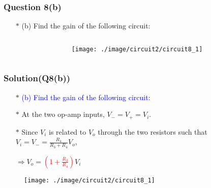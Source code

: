 \documentclass{beamer}
\newcommand{\blue}[1]{\textcolor{blue}{#1}}
\newcommand{\red}[1]{\textcolor{red}{#1}}
\begin{document}
\begin{frame}
\frametitle{Question 8(b)}
\begin{itemize} \itemsep1pt \parskip0pt 
  \item[$\ast$] (b) Find the gain of the following circuit:
\end{itemize}

\begin{columns}

\begin{column}{6cm}

\end{column}


\begin{column}{6cm}
\begin{figure}[H]
  \centering
  \texttt{[image: ./image/circuit2/circuit8\_1]}
\end{figure}
\end{column}

\end{columns}

\end{frame}


\begin{frame}
\frametitle{Solution(Q8(b))}
\begin{itemize} \itemsep1pt \parskip0pt 
  \item[$\ast$] \blue{(b) Find the gain of the following circuit:}
  \item[$\ast$] At the two op-amp inputs, $V_- = V_+ = V_i$.
  \item[$\ast$] Since $V_i$ is related to $V_o$ through the two resistors such that $V_i = V_- = \frac{R_4}{R_3 + R_4}V_o$,
  \item[] $\Rightarrow V_o = $\red{$(1 + \frac{R_3}{R_4})$}$V_i$
\end{itemize}




\begin{figure}[H]
  \centering
  \texttt{[image: ./image/circuit2/circuit8\_1]}
\end{figure}


\end{frame}

\end{document}
